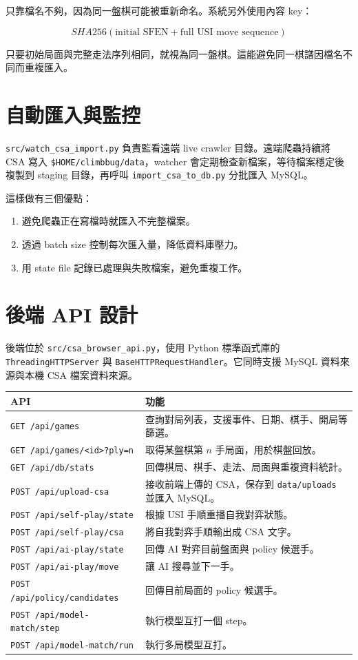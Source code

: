 \documentclass[12pt,a4paper,fontset=none]{ctexart}
\begin{document}
只靠檔名不夠，因為同一盤棋可能被重新命名。系統另外使用內容 key：

\[
SHA256(\text{initial SFEN} + \text{full USI move sequence})
\]

只要初始局面與完整走法序列相同，就視為同一盤棋。這能避免同一棋譜因檔名不同而重複匯入。

\section{自動匯入與監控}

\texttt{src/watch\_csa\_import.py} 負責監看遠端 live crawler 目錄。遠端爬蟲持續將 CSA 寫入 \texttt{\$HOME/climbbug/data}，watcher 會定期檢查新檔案，等待檔案穩定後複製到 staging 目錄，再呼叫 \texttt{import\_csa\_to\_db.py} 分批匯入 MySQL。

這樣做有三個優點：

\begin{enumerate}
  \item 避免爬蟲正在寫檔時就匯入不完整檔案。
  \item 透過 batch size 控制每次匯入量，降低資料庫壓力。
  \item 用 state file 記錄已處理與失敗檔案，避免重複工作。
\end{enumerate}

\section{後端 API 設計}

後端位於 \texttt{src/csa\_browser\_api.py}，使用 Python 標準函式庫的 \texttt{ThreadingHTTPServer} 與 \texttt{BaseHTTPRequestHandler}。它同時支援 MySQL 資料來源與本機 CSA 檔案資料來源。

\begin{longtable}{p{}p{}}
\toprule
\textbf{API} & \textbf{功能}\\
\midrule
\endhead
\texttt{GET /api/games} & 查詢對局列表，支援事件、日期、棋手、開局等篩選。\\
\texttt{GET /api/games/<id>?ply=n} & 取得某盤棋第 $n$ 手局面，用於棋盤回放。\\
\texttt{GET /api/db/stats} & 回傳棋局、棋手、走法、局面與重複資料統計。\\
\texttt{POST /api/upload-csa} & 接收前端上傳的 CSA，保存到 \texttt{data/uploads} 並匯入 MySQL。\\
\texttt{POST /api/self-play/state} & 根據 USI 手順重播自我對弈狀態。\\
\texttt{POST /api/self-play/csa} & 將自我對弈手順輸出成 CSA 文字。\\
\texttt{POST /api/ai-play/state} & 回傳 AI 對弈目前盤面與 policy 候選手。\\
\texttt{POST /api/ai-play/move} & 讓 AI 搜尋並下一手。\\
\texttt{POST /api/policy/candidates} & 回傳目前局面的 policy 候選手。\\
\texttt{POST /api/model-match/step} & 執行模型互打一個 step。\\
\texttt{POST /api/model-match/run} & 執行多局模型互打。\\
\bottomrule
\end{longtable}
\end{document}
